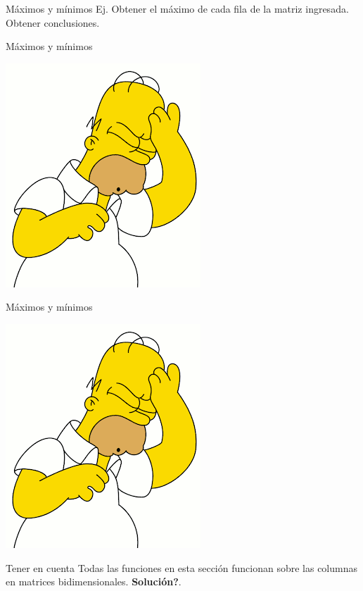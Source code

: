\documentclass{bredelebeamer}
\begin{document}
\begin{frame}{Máximos y mínimos}
Ej. Obtener el máximo de cada fila de la matriz ingresada. Obtener conclusiones.

\end{frame}


\begin{frame}{Máximos y mínimos}
\begin{center}
\includegraphics[scale=0.35]{images/img41.png}
\end{center}
\end{frame}

\begin{frame}{Máximos y mínimos}
\begin{center}
\includegraphics[scale=0.35]{images/img41.png}
\end{center}
\begin{alertblock}{Tener en cuenta}
Todas las funciones en esta sección funcionan sobre las columnas en matrices bidimensionales. \textbf{Solución?}.
\end{alertblock}
\end{frame}
\end{document}
